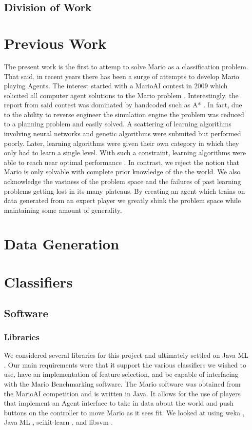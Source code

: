 \documentclass[]{article}   %
\begin{document}
\subsection{Division of Work}

\section{Previous Work}
\label{sec:prevwork}
The present work is the first to attemp to solve Mario as a classification problem.  That said, in recent years there has been a surge of attempts to develop Mario playing Agents.  The interest started with a MarioAI contest in 2009 which solicited all computer agent solutions to the Mario problem \cite{2}.  Interestingly, the report from said contest was dominated by handcoded such as A* \cite{3}.  In fact, due to the ability to reverse engineer the simulation engine the problem was reduced to a planning problem and easily solved.  A scattering of learning algorithms involving neural networks and genetic algorithms were submited but performed poorly.  Later, learning algorithms were given their own category in which they only had to learn a single level. With such a constraint, learning algorithms were able to reach near optimal performance \cite{me}. In contrast, we reject the notion that Mario is only solvable with complete prior knowledge of the the world.  We also acknowledge the vastness of the problem space and the failures of past learning problems getting lost in its many plateaus.  By creating an agent which trains on data generated from an expert player we greatly shink the problem space while maintaining some amount of generality.  



\section{Data Generation}     %
\label{sec:datagen}

\section{Classifiers}
\subsection{Software}
\subsubsection{Libraries}
We considered several libraries for this project and ultimately settled on Java ML \cite{javaml}. Our main 
requirements were that it support the various classifiers we wished to use, have an implementation of feature 
selection, and be capable of interfacing with the Mario Benchmarking \cite{mariobenchmark} software. The 
Mario software was obtained from the MarioAI competition and is written in Java. It allows for the use of 
players that implement an Agent interface to take in data about the world and push buttons on the controller 
to move Mario as it sees fit. We looked at using weka \cite{weka}, Java ML \cite{javaml}, scikit-learn 
\cite{scikit}, and libsvm \cite{libsvm}. 
\end{document}
